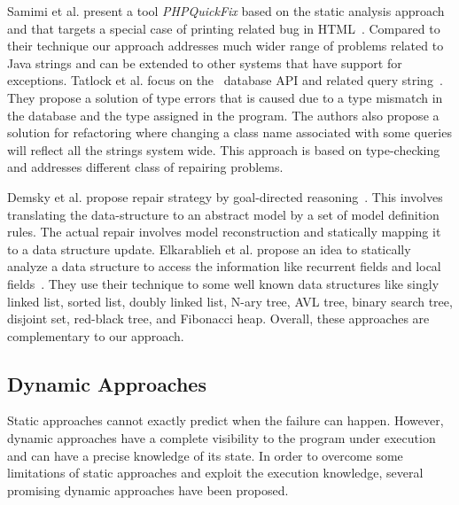Samimi et al. present a tool \textit{PHPQuickFix} based on the static analysis
approach and that targets a special case of printing related bug in
HTML~\cite{SamirniSAMTH12}. Compared to their technique our approach addresses
much wider range of problems related to Java strings and can be extended to
other systems that have support for exceptions. Tatlock et al. focus on the
\java\ database API and related query string~\cite{Tatlock:2008}. They propose a
solution of type errors that is caused due to a type mismatch in the database
and the type assigned in the program. The authors also propose a solution for
refactoring where changing a class name associated with some queries will
reflect all the strings system wide. This approach is based on type-checking and
addresses different class of repairing problems.

 Demsky et al. propose repair strategy by
goal-directed reasoning~\cite{conf/icse/DemskyR05}. This involves translating
the data-structure to an abstract model by a set of model definition rules. The
actual repair involves model reconstruction and statically mapping it to a data
structure update. Elkarablieh et al. propose an idea to statically analyze a
data structure to access the information like recurrent fields and local
fields~\cite{conf/oopsla/2007}. They use their technique to some well known data
structures like singly linked list, sorted list, doubly linked list, N-ary tree,
AVL tree, binary search tree, disjoint set, red-black tree, and Fibonacci heap.
Overall, these approaches are complementary to our approach. 

\subsection{Dynamic Approaches}

Static approaches cannot exactly predict when the failure can happen. However,
dynamic approaches have a complete visibility to the program under execution and
can have a precise knowledge of its state. In order to overcome some limitations
of static approaches and exploit the execution knowledge, several promising
dynamic approaches have been proposed.


